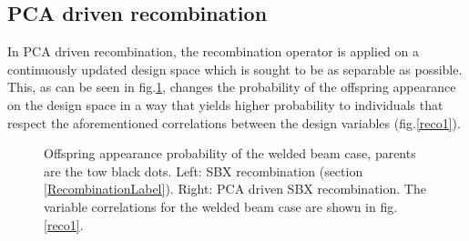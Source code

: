 \subsection{PCA driven recombination}
In PCA driven recombination, the recombination operator is applied on a continuously updated design space which is sought to be as separable as possible. This, as can be seen in fig.\ref{reco2}, changes the probability of the offspring appearance on the design space in a way that  
yields higher probability to individuals that respect the aforementioned correlations between the design variables (fig.\ref{reco1}). 

\begin{figure}[h!]
\begin{minipage}[b]{0.5\linewidth}
 \centering
\end{minipage}
\begin{minipage}[b]{0.5\linewidth}
 \centering
\end{minipage}
\caption{Offspring appearance probability of the welded beam case, parents are the tow black dots. Left: SBX recombination (section \ref{RecombinationLabel}). Right: PCA driven SBX recombination. The variable correlations for the welded beam case are shown in fig.\ref{reco1}.} 
\label{reco2}
\end{figure}

